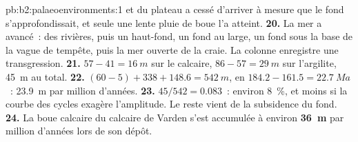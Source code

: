 \begin{solution}{pb:b2:palaeoenvironments:1}
et du plateau a cessé d'arriver à mesure que le fond s'approfondissait,
et seule une lente pluie de boue l'a atteint. \textbf{20.} La mer a avancé~:
des rivières, puis un haut-fond, un fond au large, un fond sous la base
de la vague de tempête, puis la mer ouverte de la craie. La colonne
enregistre une transgression. \textbf{21.} $57 - 41 = \qty{16}{m}$ sur le calcaire,
$86 - 57 = \qty{29}{m}$ sur l'argilite, \qty{45}{m} au total.
\textbf{22.} $(60 - 5) + 338 + 148.6 = \qty{542}{m}$, en
$184.2 - 161.5 = \qty{22.7}{Ma}$~: \qty{23.9}{m} par million d'années. \textbf{23.}
$45/542 = 0.083$~: environ \qty{8}{\percent}, et moins si la courbe des cycles
exagère l'amplitude. Le reste vient de la subsidence du fond. \textbf{24.} La
boue calcaire du calcaire de Varden s'est accumulée à environ
\textbf{\qty[text-series-to-math=true]{36}{m}} par million d'années lors de son dépôt.
\end{solution}
